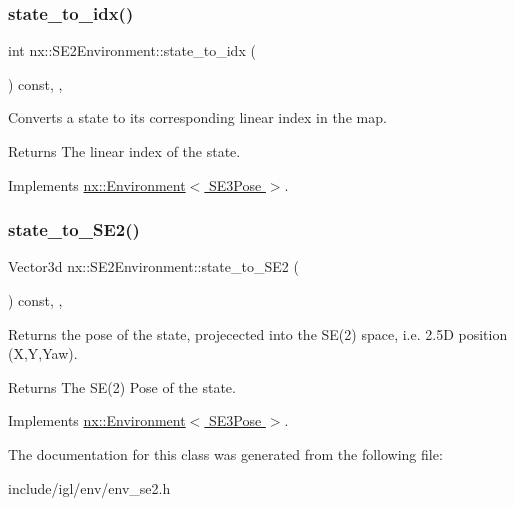 \subsubsection{\texorpdfstring{state\+\_\+to\+\_\+idx()}{state\_to\_idx()}}
{\footnotesize\ttfamily int nx\+::\+S\+E2\+Environment\+::state\+\_\+to\+\_\+idx (\begin{DoxyParamCaption}\item[{const \hyperlink{structnx_1_1SE3Pose}{S\+E3\+Pose} \&}]{ }\end{DoxyParamCaption}) const\hspace{0.3cm}{\ttfamily [inline]}, {\ttfamily [override]}, {\ttfamily [virtual]}}

Converts a state to its corresponding linear index in the map. \begin{DoxyReturn}{Returns}
The linear index of the state. 
\end{DoxyReturn}


Implements \hyperlink{classnx_1_1Environment_a1c558036435de03a3afd85e940aad600}{nx\+::\+Environment$<$ S\+E3\+Pose $>$}.

\mbox{\label{classnx_1_1SE2Environment_ab1f9056e6fffe905ec225ee3885679b4}} 
\subsubsection{\texorpdfstring{state\+\_\+to\+\_\+\+S\+E2()}{state\_to\_SE2()}}
{\footnotesize\ttfamily Vector3d nx\+::\+S\+E2\+Environment\+::state\+\_\+to\+\_\+\+S\+E2 (\begin{DoxyParamCaption}\item[{const \hyperlink{structnx_1_1SE3Pose}{S\+E3\+Pose} \&}]{ }\end{DoxyParamCaption}) const\hspace{0.3cm}{\ttfamily [inline]}, {\ttfamily [override]}, {\ttfamily [virtual]}}

Returns the pose of the state, projecected into the S\+E(2) space, i.\+e. 2.\+5D position (X,Y,Yaw). \begin{DoxyReturn}{Returns}
The S\+E(2) Pose of the state. 
\end{DoxyReturn}


Implements \hyperlink{classnx_1_1Environment_ae31bd7f19efac45fc07d405f1fcfd2b2}{nx\+::\+Environment$<$ S\+E3\+Pose $>$}.



The documentation for this class was generated from the following file\+:\begin{DoxyCompactItemize}
\item 
include/igl/env/env\+\_\+se2.\+h\end{DoxyCompactItemize}
